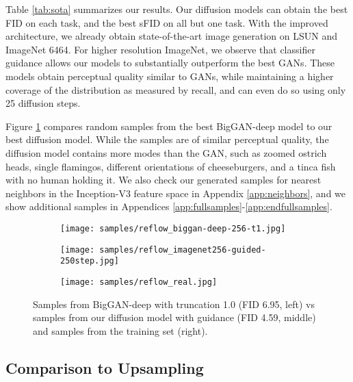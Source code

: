 \documentclass{article}
\begin{document}
Table \ref{tab:sota} summarizes our results. Our diffusion models can obtain the best FID on each task, and the best sFID on all but one task. With the improved architecture, we already obtain state-of-the-art image generation on LSUN and ImageNet 6464. For higher resolution ImageNet, we observe that classifier guidance allows our models to substantially outperform the best GANs. These models obtain perceptual quality similar to GANs, while maintaining a higher coverage of the distribution as measured by recall, and can even do so using only 25 diffusion steps.

Figure \ref{fig:diversity} compares random samples from the best BigGAN-deep model to our best diffusion model. While the samples are of similar perceptual quality, the diffusion model contains more modes than the GAN, such as zoomed ostrich heads, single flamingos, different orientations of cheeseburgers, and a tinca fish with no human holding it. We also check our generated samples for nearest neighbors in the Inception-V3 feature space in Appendix \ref{app:neighbors}, and we show additional samples in Appendices \ref{app:fullsamples}-\ref{app:endfullsamples}.
\begin{figure}[ht]
    \begin{center}
    \begin{subfigure}[]{0.31\textwidth}
    \centerline{\texttt{[image: samples/reflow\_biggan-deep-256-t1.jpg]}}
    \end{subfigure}\quad
    \begin{subfigure}[]{0.31\textwidth}
    \centerline{\texttt{[image: samples/reflow\_imagenet256-guided-250step.jpg]}}
    \end{subfigure}\quad
    \begin{subfigure}[]{0.31\textwidth}
    \centerline{\texttt{[image: samples/reflow\_real.jpg]}}
    \end{subfigure}
    \caption{\label{fig:diversity} Samples from BigGAN-deep with truncation 1.0 (FID 6.95, left) vs samples from our diffusion model with guidance (FID 4.59, middle) and samples from the training set (right).}
    \end{center}
    \vskip -0.2in
\end{figure}

\subsection{Comparison to Upsampling}
\end{document}
